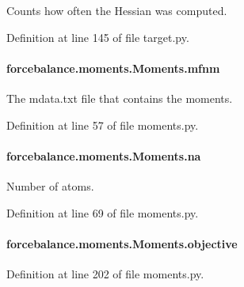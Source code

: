 Counts how often the Hessian was computed. 



Definition at line 145 of file target.\-py.

\hypertarget{classforcebalance_1_1moments_1_1Moments_ab9cf14ace681ac05db60b368b7726311}{
\paragraph[{mfnm}]{\setlength{\rightskip}{0pt plus 5cm}forcebalance.\-moments.\-Moments.\-mfnm}}\label{classforcebalance_1_1moments_1_1Moments_ab9cf14ace681ac05db60b368b7726311}


The mdata.\-txt file that contains the moments. 



Definition at line 57 of file moments.\-py.

\hypertarget{classforcebalance_1_1moments_1_1Moments_ab04edfe986c2fc46d11af156d76a7b2f}{
\paragraph[{na}]{\setlength{\rightskip}{0pt plus 5cm}forcebalance.\-moments.\-Moments.\-na}}\label{classforcebalance_1_1moments_1_1Moments_ab04edfe986c2fc46d11af156d76a7b2f}


Number of atoms. 



Definition at line 69 of file moments.\-py.

\hypertarget{classforcebalance_1_1moments_1_1Moments_aa90c357e8ee9f18bb9db99688bbeb227}{
\paragraph[{objective}]{\setlength{\rightskip}{0pt plus 5cm}forcebalance.\-moments.\-Moments.\-objective}}\label{classforcebalance_1_1moments_1_1Moments_aa90c357e8ee9f18bb9db99688bbeb227}


Definition at line 202 of file moments.\-py.

